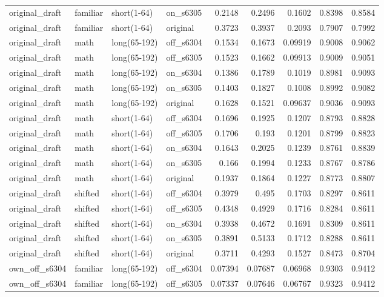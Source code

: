 \begin{table}
\begin{tabular}{llllrrrrr}
original\_draft & familiar & short(1-64) & on\_s6305 & 0.2148 & 0.2496 & 0.1602 & 0.8398 & 0.8584 \\
original\_draft & familiar & short(1-64) & original & 0.3723 & 0.3937 & 0.2093 & 0.7907 & 0.7992 \\
original\_draft & math & long(65-192) & off\_s6304 & 0.1534 & 0.1673 & 0.09919 & 0.9008 & 0.9062 \\
original\_draft & math & long(65-192) & off\_s6305 & 0.1523 & 0.1662 & 0.09913 & 0.9009 & 0.9051 \\
original\_draft & math & long(65-192) & on\_s6304 & 0.1386 & 0.1789 & 0.1019 & 0.8981 & 0.9093 \\
original\_draft & math & long(65-192) & on\_s6305 & 0.1403 & 0.1827 & 0.1008 & 0.8992 & 0.9082 \\
original\_draft & math & long(65-192) & original & 0.1628 & 0.1521 & 0.09637 & 0.9036 & 0.9093 \\
original\_draft & math & short(1-64) & off\_s6304 & 0.1696 & 0.1925 & 0.1207 & 0.8793 & 0.8828 \\
original\_draft & math & short(1-64) & off\_s6305 & 0.1706 & 0.193 & 0.1201 & 0.8799 & 0.8823 \\
original\_draft & math & short(1-64) & on\_s6304 & 0.1643 & 0.2025 & 0.1239 & 0.8761 & 0.8839 \\
original\_draft & math & short(1-64) & on\_s6305 & 0.166 & 0.1994 & 0.1233 & 0.8767 & 0.8786 \\
original\_draft & math & short(1-64) & original & 0.1937 & 0.1864 & 0.1227 & 0.8773 & 0.8807 \\
original\_draft & shifted & short(1-64) & off\_s6304 & 0.3979 & 0.495 & 0.1703 & 0.8297 & 0.8611 \\
original\_draft & shifted & short(1-64) & off\_s6305 & 0.4348 & 0.4929 & 0.1716 & 0.8284 & 0.8611 \\
original\_draft & shifted & short(1-64) & on\_s6304 & 0.3938 & 0.4672 & 0.1691 & 0.8309 & 0.8611 \\
original\_draft & shifted & short(1-64) & on\_s6305 & 0.3891 & 0.5133 & 0.1712 & 0.8288 & 0.8611 \\
original\_draft & shifted & short(1-64) & original & 0.3711 & 0.4293 & 0.1527 & 0.8473 & 0.8704 \\
own\_off\_s6304 & familiar & long(65-192) & off\_s6304 & 0.07394 & 0.07687 & 0.06968 & 0.9303 & 0.9412 \\
own\_off\_s6304 & familiar & long(65-192) & off\_s6305 & 0.07337 & 0.07646 & 0.06767 & 0.9323 & 0.9412 \\

\end{tabular}
\end{table}
